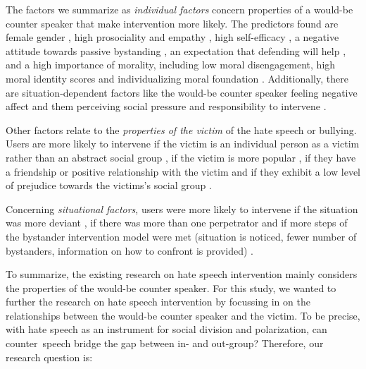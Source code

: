 \documentclass[runningheads]{llncs}
\begin{document}
The factors we summarize as \emph{individual factors} concern properties of a would-be counter speaker that make intervention more likely. The predictors found are female gender \autocite{lambeStandingBullyingSocial2019,wilhelmGenderedMoralityBacklash2019}, high prosociality and empathy \autocite{lambeStandingBullyingSocial2019}, high self-efficacy \autocite{lambeStandingBullyingSocial2019}, a negative attitude towards passive bystanding \autocite{lambeStandingBullyingSocial2019}, an expectation that defending will help \autocite{lambeStandingBullyingSocial2019}, and a high importance of morality, including low moral disengagement, high moral identity scores and individualizing moral foundation \autocite{lambeStandingBullyingSocial2019,wilhelmGenderedMoralityBacklash2019}. Additionally, there are situation-dependent factors like the would-be counter speaker feeling negative affect \autocite{chenOnlineIncivilityPublic2017,dickterConfrontingHateHeterosexuals2012,dickterConfrontNotConfront2013} and them perceiving social pressure and responsibility to intervene \autocite{dickterConfrontingHateHeterosexuals2012,dickterConfrontNotConfront2013,wongCombatingOnlineAbuse2016}.

Other factors relate to the \emph{properties of the victim} of the hate speech or bullying. Users are more likely to intervene if the victim is an individual person as a victim rather than an abstract social group \autocite{naabFlaggingUncivilUser2018}, if the victim is more popular \autocite{lambeStandingBullyingSocial2019}, if they have a friendship or positive relationship with the victim \autocite{lambeStandingBullyingSocial2019} and if they exhibit a low level of prejudice towards the victims's social group \autocite{dickterConfrontingHateHeterosexuals2012}.

Concerning \emph{situational factors}, users were more likely to intervene if the situation was more deviant \autocite{dickterConfrontingHateHeterosexuals2012,dickterConfrontNotConfront2013,naabFlaggingUncivilUser2018}, if there was more than one perpetrator \autocite{kazerooniCyberbullyingBystanderIntervention2018} and if more steps of the bystander intervention model were met (situation is noticed, fewer number of bystanders, information on how to confront is provided) \autocite{lambeStandingBullyingSocial2019,naabFlaggingUncivilUser2018}.

To summarize, the existing research on hate speech intervention mainly considers the properties of the would-be counter speaker. For this study, we wanted to further the research on hate speech intervention by focussing in on the relationships between the would-be counter speaker and the victim. To be precise, with hate speech as an instrument for social division and polarization, can counter~speech bridge the gap between in- and out-group? Therefore, our research question is:
\end{document}
